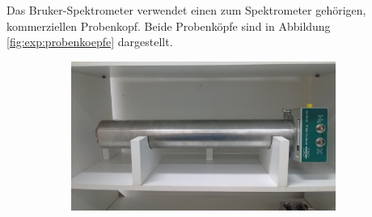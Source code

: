 Das Bruker-Spektrometer verwendet einen zum Spektrometer gehörigen, kommerziellen Probenkopf. Beide Probenköpfe sind in Abbildung \ref{fig:exp:probenkoepfe} dargestellt.
\begin{figure}
	\centering
	\begin{subfigure}{.35\textwidth}
		\centering
		\includegraphics[width=0.95\textwidth]{graphics/probenkopf/IMG_20180419_160830226.jpg}
		\caption{ }
		\label{fig:exp:probenkopf_bruker}
	\end{subfigure}%
	\begin{subfigure}{.10\textwidth}
		\centering

\end{subfigure}
\end{figure}
